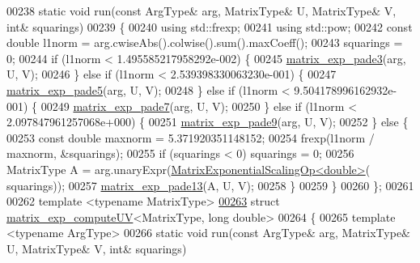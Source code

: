 \begin{DoxyCode}
00238   \textcolor{keyword}{static} \textcolor{keywordtype}{void} run(\textcolor{keyword}{const} ArgType& arg, MatrixType& U, MatrixType& V, \textcolor{keywordtype}{int}& squarings)
00239   \{
00240     \textcolor{keyword}{using} std::frexp;
00241     \textcolor{keyword}{using} std::pow;
00242     \textcolor{keyword}{const} \textcolor{keywordtype}{double} l1norm = arg.cwiseAbs().colwise().sum().maxCoeff();
00243     squarings = 0;
00244     \textcolor{keywordflow}{if} (l1norm < 1.495585217958292e-002) \{
00245       \hyperlink{namespace_eigen_1_1internal_a7e6cf2e01b6fb376d33b9bb8183e5777}{matrix\_exp\_pade3}(arg, U, V);
00246     \} \textcolor{keywordflow}{else} \textcolor{keywordflow}{if} (l1norm < 2.539398330063230e-001) \{
00247       \hyperlink{namespace_eigen_1_1internal_af4992d182490219270a24aaa8285e63a}{matrix\_exp\_pade5}(arg, U, V);
00248     \} \textcolor{keywordflow}{else} \textcolor{keywordflow}{if} (l1norm < 9.504178996162932e-001) \{
00249       \hyperlink{namespace_eigen_1_1internal_a1abecb439e6cb1b5188828cdb7e0ab60}{matrix\_exp\_pade7}(arg, U, V);
00250     \} \textcolor{keywordflow}{else} \textcolor{keywordflow}{if} (l1norm < 2.097847961257068e+000) \{
00251       \hyperlink{namespace_eigen_1_1internal_a218447e97bf869bf354f92e020a7355a}{matrix\_exp\_pade9}(arg, U, V);
00252     \} \textcolor{keywordflow}{else} \{
00253       \textcolor{keyword}{const} \textcolor{keywordtype}{double} maxnorm = 5.371920351148152;
00254       frexp(l1norm / maxnorm, &squarings);
00255       \textcolor{keywordflow}{if} (squarings < 0) squarings = 0;
00256       MatrixType A = arg.unaryExpr(\hyperlink{struct_eigen_1_1internal_1_1_matrix_exponential_scaling_op}{MatrixExponentialScalingOp<double>}(
      squarings));
00257       \hyperlink{namespace_eigen_1_1internal_ae7d0962a143c96343984440db683905a}{matrix\_exp\_pade13}(A, U, V);
00258     \}
00259   \}
00260 \};
00261   
00262 \textcolor{keyword}{template} <\textcolor{keyword}{typename} MatrixType>
\hyperlink{struct_eigen_1_1internal_1_1matrix__exp__compute_u_v_3_01_matrix_type_00_01long_01double_01_4}{00263} \textcolor{keyword}{struct }\hyperlink{struct_eigen_1_1internal_1_1matrix__exp__compute_u_v}{matrix\_exp\_computeUV}<MatrixType, long double>
00264 \{
00265   \textcolor{keyword}{template} <\textcolor{keyword}{typename} ArgType>
00266   \textcolor{keyword}{static} \textcolor{keywordtype}{void} run(\textcolor{keyword}{const} ArgType& arg, MatrixType& U, MatrixType& V, \textcolor{keywordtype}{int}& squarings)

\end{DoxyCode}
